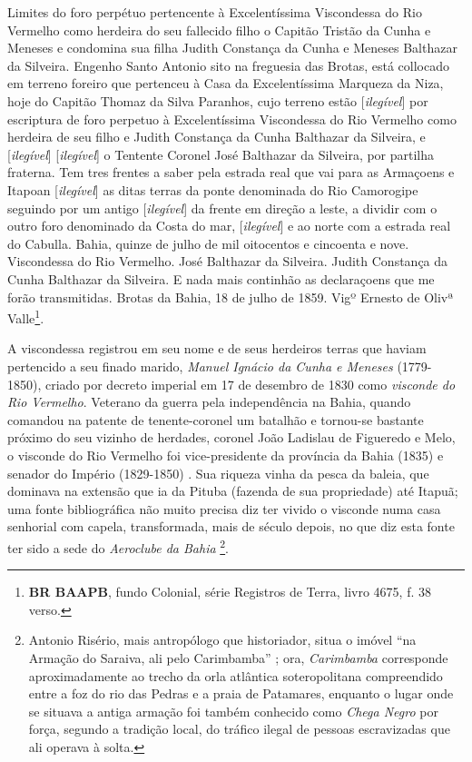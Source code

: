 \begin{citacao}
Limites do foro perpétuo pertencente à Excelentíssima Viscondessa do Rio Vermelho como herdeira do seu fallecido filho o Capitão Tristão da Cunha e Meneses e condomina sua filha Judith Constança da Cunha e Meneses Balthazar da Silveira. Engenho Santo Antonio sito na freguesia das Brotas, está collocado em terreno foreiro que pertenceu à Casa da Excelentíssima Marqueza da Niza, hoje do Capitão Thomaz da Silva Paranhos, cujo terreno estão [\textit{ilegível}] por escriptura de foro perpetuo à Excelentíssima Viscondessa do Rio Vermelho como herdeira de seu filho e Judith Constança da Cunha Balthazar da Silveira, e [\textit{ilegível}] [\textit{ilegível}] o Tentente Coronel José Balthazar da Silveira, por partilha fraterna. Tem tres frentes a saber pela estrada real que vai para as Armaçoens e Itapoan [\textit{ilegível}] as ditas terras da ponte denominada do Rio Camorogipe seguindo por um antigo [\textit{ilegível}] da frente em direção a leste, a dividir com o outro foro denominado da Costa do mar, [\textit{ilegível}] e ao norte com a estrada real do Cabulla. Bahia, quinze de julho de mil oitocentos e cincoenta e nove. Viscondessa do Rio Vermelho. José Balthazar da Silveira. Judith Constança da Cunha Balthazar da Silveira. E nada mais continhão as declaraçoens que me forão transmitidas. Brotas da Bahia, 18 de julho de 1859. Vigº Ernesto de Olivª Valle\footnote{\textbf{BR BAAPB}, fundo Colonial, série Registros de Terra, livro 4675, f. 38 verso.}.
\end{citacao}

A viscondessa registrou em seu nome e de seus herdeiros terras que haviam pertencido a seu finado marido, \textit{Manuel Ignácio da Cunha e Meneses} (1779-1850), criado por decreto imperial em 17 de desembro de 1830 como \textit{visconde do Rio Vermelho}. Veterano da guerra pela independência na Bahia, quando comandou na patente de tenente-coronel um batalhão e tornou-se bastante próximo do seu vizinho de herdades, coronel João Ladislau de Figueredo e Melo, o visconde do Rio Vermelho foi vice-presidente da província da Bahia (1835) e senador do Império (1829-1850) \cite[p.~404]{vasconcellos_arnobili_1918}. Sua riqueza vinha da pesca da baleia, que dominava na extensão que ia da Pituba (fazenda de sua propriedade) até Itapuã; uma fonte bibliográfica não muito precisa diz ter vivido o visconde numa casa senhorial com capela, transformada, mais de século depois, no que diz esta fonte ter sido a sede do \textit{Aeroclube da Bahia} \cite{riserio_histba_2004}\footnote{Antonio Risério, mais antropólogo que historiador, situa o imóvel ``na Armação do Saraiva, ali pelo Carimbamba'' \cite{riserio_histba_2004}; ora, \textit{Carimbamba} corresponde aproximadamente ao trecho da orla atlântica soteropolitana compreendido entre a foz do rio das Pedras e a praia de Patamares, enquanto o lugar onde se situava a antiga armação foi também conhecido como \textit{Chega Negro} por força, segundo a tradição local, do tráfico ilegal de pessoas escravizadas que ali operava à solta.}.

